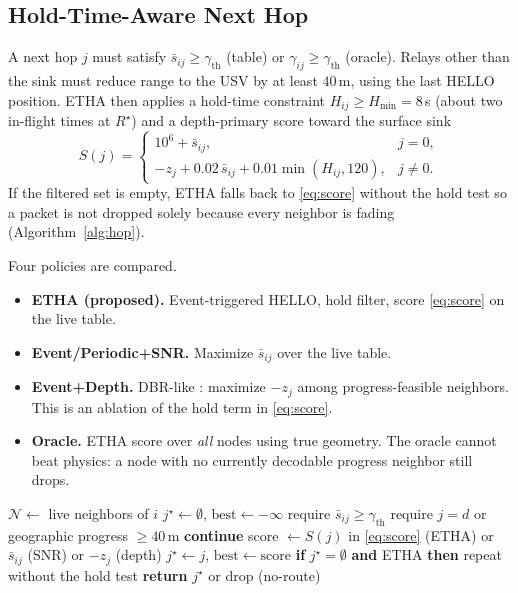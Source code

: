 \documentclass[journal]{IEEEtran}
\begin{document}
\subsection{Hold-Time-Aware Next Hop}
A next hop $j$ must satisfy $\bar{s}_{ij}\ge\gamma_{\mathrm{th}}$
(table) or $\gamma_{ij}\ge\gamma_{\mathrm{th}}$ (oracle). Relays other
than the sink must reduce range to the USV by at least $40$\,m, using
the last HELLO position. ETHA then applies a hold-time constraint
$H_{ij}\ge H_{\min}=8$\,s (about two in-flight times at $R^{\star}$)
and a depth-primary score toward the surface sink
\begin{equation}
S(j)=
\begin{cases}
10^{6}+\bar{s}_{ij}, & j=0,\\
-z_j+0.02\,\bar{s}_{ij}+0.01\min(H_{ij},120), & j\neq 0.
\end{cases}
\label{eq:score}
\end{equation}
If the filtered set is empty, ETHA falls back to \eqref{eq:score}
without the hold test so a packet is not dropped solely because every
neighbor is fading (Algorithm~\ref{alg:hop}).

Four policies are compared.

\begin{itemize}
\item \textbf{ETHA (proposed).} Event-triggered HELLO, hold filter,
score \eqref{eq:score} on the live table.
\item \textbf{Event/Periodic+SNR.} Maximize $\bar{s}_{ij}$ over the live table.
\item \textbf{Event+Depth.} DBR-like \cite{yan2008dbr}: maximize $-z_j$
among progress-feasible neighbors. This is an ablation of the hold
term in \eqref{eq:score}.
\item \textbf{Oracle.} ETHA score over \emph{all} nodes using true
geometry. The oracle cannot beat physics: a node with no currently
decodable progress neighbor still drops.
\end{itemize}

\begin{algorithm}[!t]
\caption{Table-driven next hop toward sink $d$}
\label{alg:hop}
\begin{algorithmic}[1]
\STATE $\mathcal{N}\leftarrow$ live neighbors of $i$
\STATE $j^{\star}\leftarrow \emptyset$, $\mathrm{best}\leftarrow -\infty$
\STATE require $\bar{s}_{ij}\ge\gamma_{\mathrm{th}}$
\STATE require $j=d$ or geographic progress $\ge 40$\,m
 \STATE \textbf{continue} \ENDIF
\STATE score $\leftarrow S(j)$ in \eqref{eq:score} (ETHA) or $\bar{s}_{ij}$ (SNR) or $-z_j$ (depth)
\STATE $j^{\star}\leftarrow j$, $\mathrm{best}\leftarrow\mathrm{score}$
\ENDIF
\ENDFOR
\STATE \textbf{if} $j^{\star}=\emptyset$ \textbf{and} ETHA \textbf{then} repeat without the hold test
\STATE \textbf{return} $j^{\star}$ or drop (no-route)
\end{algorithmic}
\end{algorithm}
\end{document}
